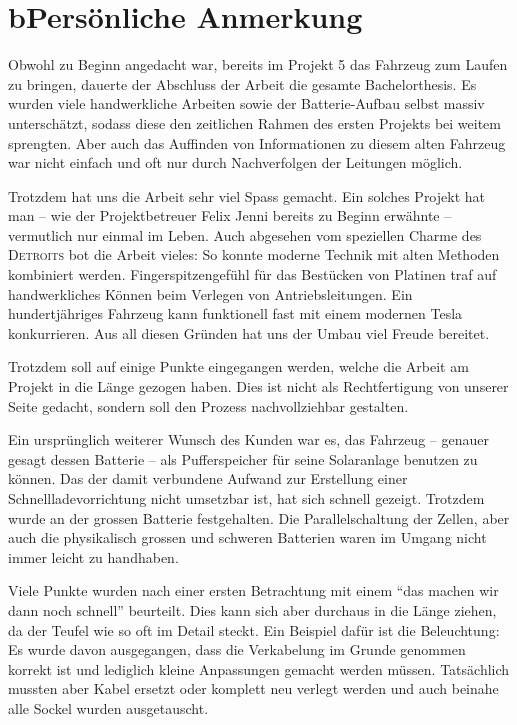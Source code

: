 \chapter*{b\quad Persönliche Anmerkung}
Obwohl zu Beginn angedacht war, bereits im Projekt 5 das Fahrzeug zum Laufen zu bringen, dauerte der Abschluss der Arbeit die gesamte Bachelorthesis. Es wurden viele handwerkliche Arbeiten sowie der Batterie-Aufbau selbst massiv unterschätzt, sodass diese den zeitlichen Rahmen des ersten Projekts bei weitem sprengten. Aber auch das Auffinden von Informationen zu diesem alten Fahrzeug war nicht einfach und oft nur durch Nachverfolgen der Leitungen möglich.

Trotzdem hat uns die Arbeit sehr viel Spass gemacht. Ein solches Projekt hat man -- wie der Projektbetreuer Felix Jenni bereits zu Beginn erwähnte -- vermutlich nur einmal im Leben. Auch abgesehen vom speziellen Charme des \textsc{Detroits} bot die Arbeit vieles: So konnte moderne Technik mit alten Methoden kombiniert werden. Fingerspitzengefühl für das Bestücken von Platinen traf auf handwerkliches Können beim Verlegen von Antriebsleitungen. Ein hundertjähriges Fahrzeug kann funktionell fast mit einem modernen Tesla konkurrieren. Aus all diesen Gründen hat uns der Umbau viel Freude bereitet.

Trotzdem soll auf einige Punkte eingegangen werden, welche die Arbeit am Projekt in die Länge gezogen haben. Dies ist nicht als Rechtfertigung von unserer Seite gedacht, sondern soll den Prozess nachvollziehbar gestalten.

Ein ursprünglich weiterer Wunsch des Kunden war es, das Fahrzeug -- genauer gesagt dessen Batterie -- als Pufferspeicher für seine Solaranlage benutzen zu können. Das der damit verbundene Aufwand zur Erstellung einer Schnellladevorrichtung nicht umsetzbar ist, hat sich schnell gezeigt. Trotzdem wurde an der grossen Batterie festgehalten. Die Parallelschaltung der Zellen, aber auch die physikalisch grossen und schweren Batterien waren im Umgang nicht immer leicht zu handhaben.

Viele Punkte wurden nach einer ersten Betrachtung mit einem "`das machen wir dann noch schnell"' beurteilt. Dies kann sich aber durchaus in die Länge ziehen, da der Teufel wie so oft im Detail steckt. Ein Beispiel dafür ist die Beleuchtung: Es wurde davon ausgegangen, dass die Verkabelung im Grunde genommen korrekt ist und lediglich kleine Anpassungen gemacht werden müssen. Tatsächlich mussten aber Kabel ersetzt oder komplett neu verlegt werden und auch beinahe alle Sockel wurden ausgetauscht.

